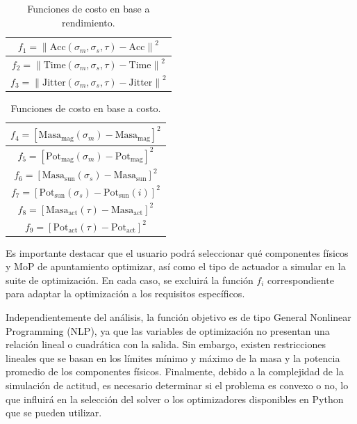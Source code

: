 \begin{table}[H]
	\centering
	\caption{Funciones de costo en base a rendimiento.}
	\label{tab:f_rend}
	\begin{tabular}{|c|}
		\hline
		$f_1 = \left\lVert \text{Acc}(\sigma_m, \sigma_s, \tau) - \text{Acc} \right\rVert^2$ \\ \hline
		$f_2 = \left\lVert \text{Time}(\sigma_m, \sigma_s, \tau) - \text{Time} \right\rVert^2$ \\ \hline
		$f_3 = \left\lVert \text{Jitter}(\sigma_m, \sigma_s, \tau) - \text{Jitter} \right\rVert^2$ \\ \hline
	\end{tabular}
\end{table}

\begin{table}[H]
	\centering
	\caption{Funciones de costo en base a costo.}
	\label{tab:f_cost}
	\begin{tabular}{|c|}
		\hline
		$f_4 = \left[ \text{Masa}_{\text{mag}}(\sigma_m) - \text{Masa}_{\text{mag}} \right]^2$ \\ \hline
		$f_5 = \left[ \text{Pot}_{\text{mag}}(\sigma_m) - \text{Pot}_{\text{mag}} \right]^2$ \\ \hline
		$f_6 = \left[ \text{Masa}_{\text{sun}}(\sigma_s) - \text{Masa}_{\text{sun}} \right]^2$ \\ \hline
		$f_7 = \left[ \text{Pot}_{\text{sun}}(\sigma_s) - \text{Pot}_{\text{sun}}(i) \right]^2$ \\ \hline
		$f_8 = \left[ \text{Masa}_{\text{act}}(\tau) - \text{Masa}_{\text{act}} \right]^2$ \\ \hline
		$f_9 = \left[ \text{Pot}_{\text{act}}(\tau) - \text{Pot}_{\text{act}} \right]^2$ \\ \hline
	\end{tabular}
\end{table}

Es importante destacar que el usuario podrá seleccionar qué componentes físicos y MoP de apuntamiento optimizar, así como el tipo de actuador a simular en la suite de optimización. En cada caso, se excluirá la función $f_i$ correspondiente para adaptar la optimización a los requisitos específicos.

Independientemente del análisis, la función objetivo es de tipo General Nonlinear Programming (NLP), ya que las variables de optimización no presentan una relación lineal o cuadrática con la salida. Sin embargo, existen restricciones lineales que se basan en los límites mínimo y máximo de la masa y la potencia promedio de los componentes físicos. Finalmente, debido a la complejidad de la simulación de actitud, es necesario determinar si el problema es convexo o no, lo que influirá en la selección del solver o los optimizadores disponibles en Python que se pueden utilizar.

